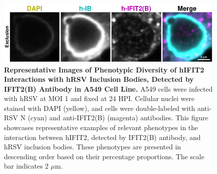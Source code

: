 \begin{figure}
    \centering
    \includegraphics[width=1\linewidth]{08. Chapter 3/Figs/02. Infection/02. IFIT2/02. IFIT2B/03. i2b-a549.pdf} 
    \caption[Representative Images of Phenotypic Diversity of hIFIT2 Interactions with hRSV Inclusion Bodies, Detected by IFIT2(B) Antibody in A549 Cell Line.]{\textbf{Representative Images of Phenotypic Diversity of hIFIT2 Interactions with hRSV Inclusion Bodies, Detected by IFIT2(B) Antibody in A549 Cell Line.} A549 cells were infected with hRSV at MOI 1 and fixed at 24 HPI. Cellular nuclei were stained with DAPI (yellow), and cells were double-labeled with anti-RSV N (cyan) and anti-IFIT2(B) (magenta) antibodies. This figure showcases representative examples of relevant phenotypes in the interaction between hIFIT2, detected by IFIT2(B) antibody, and hRSV inclusion bodies. These phenotypes are presented in descending order based on their percentage proportions. The scale bar indicates 2 \(\mu \mbox{m}\).}
    \label{fig:Representative Images of Phenotypic Diversity of hIFIT2 Interactions with hRSV Inclusion Bodies, Detected by IFIT2(B) Antibody in A549 Cell Line}
\end{figure}

